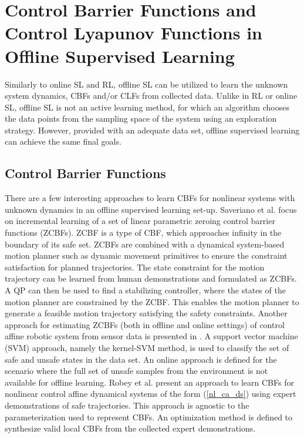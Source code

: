 \documentclass[3p,times,procedia]{elsarticle}
\begin{document}
\section{Control Barrier Functions and Control Lyapunov Functions in Offline Supervised Learning}\label{sec:offline_supervised}
Similarly to online SL and RL, offline SL can be utilized to learn the unknown system dynamics, CBFs and/or CLFs from collected data. Unlike in RL or online SL, offline SL is not an active learning method, for which an algorithm chooses the data points from the sampling space of the system using an exploration strategy. However, provided with an adequate data set, offline supervised learning can achieve the same final goals. 

\subsection{Control Barrier Functions}\label{sec:offline-cbf}

There are a few interesting approaches to learn CBFs for nonlinear systems with unknown dynamics in an offline supervised learning set-up. Saveriano et al. \cite{Saveriano2019} focus on incremental learning of a set of linear parametric zeroing control barrier functions (ZCBFs)\cite{Ames2019}. ZCBF is a type of CBF, which approaches infinity in the boundary of its safe set. ZCBFs are combined with a dynamical system-based motion planner such as dynamic movement primitives to ensure the constraint satisfaction for planned trajectories. The state constraint for the motion trajectory can be learned from human demonstrations and formulated as ZCBFs. A QP can then be used to find a stabilizing controller, where the states of the motion planner are constrained by the ZCBF. This enables the motion planner to generate a feasible motion trajectory satisfying the safety constraints. Another approach for estimating ZCBFs (both in offline and online settings) of control affine robotic system from sensor data is presented in \cite{Srinivasan2020}. A support vector machine (SVM) approach, namely the kernel-SVM method, is used to classify the set of safe and unsafe states in the data set. An online approach is defined for the scenario where the full set of unsafe samples from the environment is not available for offline learning. Robey et al. \cite{Robey2020} present an approach to learn CBFs for nonlinear control affine dynamical systems of the form (\ref{nl_ca_ds}) using expert demonstrations of safe trajectories. This approach is agnostic to the parameterization used to represent CBFs. An optimization method is defined to synthesize valid local CBFs from the collected expert demonstrations. 
\end{document}
